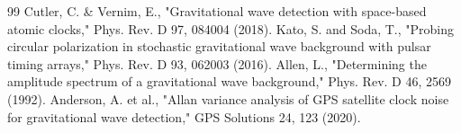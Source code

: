 \documentclass[12pt,a4paper]{article}
\begin{document}
\begin{thebibliography}{99}
 Cutler, C. \& Vernim, E., "Gravitational wave detection with space-based atomic clocks," Phys. Rev. D 97, 084004 (2018).
 Kato, S. and Soda, T., "Probing circular polarization in stochastic gravitational wave background with pulsar timing arrays," Phys. Rev. D 93, 062003 (2016).
 Allen, L., "Determining the amplitude spectrum of a gravitational wave background," Phys. Rev. D 46, 2569 (1992).
 Anderson, A. et al., "Allan variance analysis of GPS satellite clock noise for gravitational wave detection," GPS Solutions 24, 123 (2020).
\end{thebibliography}
\end{document}
